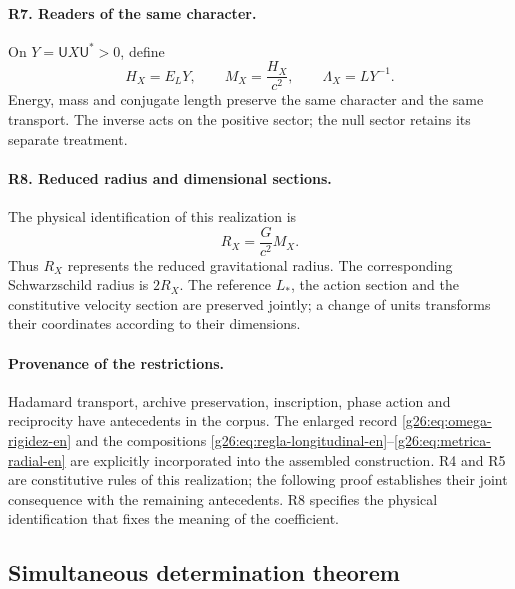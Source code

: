 \paragraph{R7. Readers of the same character.}
On \(Y=\mathsf U X\mathsf U^*>0\), define
\begin{equation}
 H_X=E_{L}Y,\qquad M_X=\frac{H_X}{c^2},\qquad
 \Lambda_X=LY^{-1}.
 \label{g26:eq:lecturas-conjugadas-en}
\end{equation}
Energy, mass and conjugate length preserve the same character and the
same transport. The inverse acts on the positive sector; the null
sector retains its separate treatment.

\paragraph{R8. Reduced radius and dimensional sections.}
The physical identification of this realization is
\begin{equation}
 R_X=\frac{G}{c^2}M_X.
 \label{g26:eq:radio-reducido-en}
\end{equation}
Thus \(R_X\) represents the reduced gravitational radius. The
corresponding Schwarzschild radius is \(2R_X\). The reference
\(L_*\), the action section and the constitutive velocity section
are preserved jointly; a change of units transforms their coordinates
according to their dimensions.

\paragraph{Provenance of the restrictions.}
Hadamard transport, archive preservation, inscription, phase action
and reciprocity have antecedents in the corpus. The enlarged record
\eqref{g26:eq:omega-rigidez-en} and the compositions
\eqref{g26:eq:regla-longitudinal-en}--\eqref{g26:eq:metrica-radial-en}
are explicitly incorporated into the assembled construction. R4 and
R5 are constitutive rules of this realization; the following proof
establishes their joint consequence with the remaining antecedents.
R8 specifies the physical identification that fixes the meaning of
the coefficient.

\subsection{Simultaneous determination theorem}

